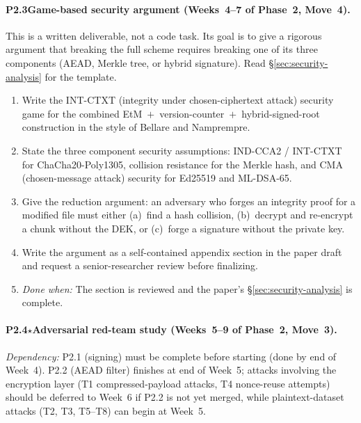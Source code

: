 \documentclass[11pt]{article}
\begin{document}
\paragraph{P2.3\enspace Game-based security argument
(Weeks~4--7 of Phase~2, \textbf{Move~4}).}
This is a written deliverable, not a code task. Its goal is to give a
rigorous argument that breaking the full scheme requires breaking one of
its three components (AEAD, Merkle tree, or hybrid signature). Read
\S\ref{sec:security-analysis} for the template.

\begin{enumerate}[nosep]
  \item Write the INT-CTXT (integrity under chosen-ciphertext attack) security
    game for the combined EtM~$+$~version-counter~$+$~hybrid-signed-root
    construction in the style of Bellare and Namprempre.
  \item State the three component security assumptions: IND-CCA2 / INT-CTXT
    for ChaCha20-Poly1305, collision resistance for the Merkle hash, and
    CMA (chosen-message attack) security for Ed25519 and ML-DSA-65.
  \item Give the reduction argument: an adversary who forges an
    integrity proof for a modified file must either (a)~find a hash
    collision, (b)~decrypt and re-encrypt a chunk without the DEK, or
    (c)~forge a signature without the private key.
  \item Write the argument as a self-contained appendix section in the
    paper draft and request a senior-researcher review before finalizing.
  \item \emph{Done when:} The section is reviewed and the paper's
    \S\ref{sec:security-analysis} is complete.
\end{enumerate}

\paragraph{P2.4$\star$\enspace Adversarial red-team study
(Weeks~5--9 of Phase~2, \textbf{Move~3}).}
\textit{Dependency:} P2.1 (signing) must be complete before starting
(done by end of Week~4). P2.2 (AEAD filter) finishes at end of Week~5;
attacks involving the encryption layer (T1 compressed-payload attacks, T4
nonce-reuse attempts) should be deferred to Week~6 if P2.2 is not yet
merged, while plaintext-dataset attacks (T2, T3, T5--T8) can begin at
Week~5.
\end{document}
